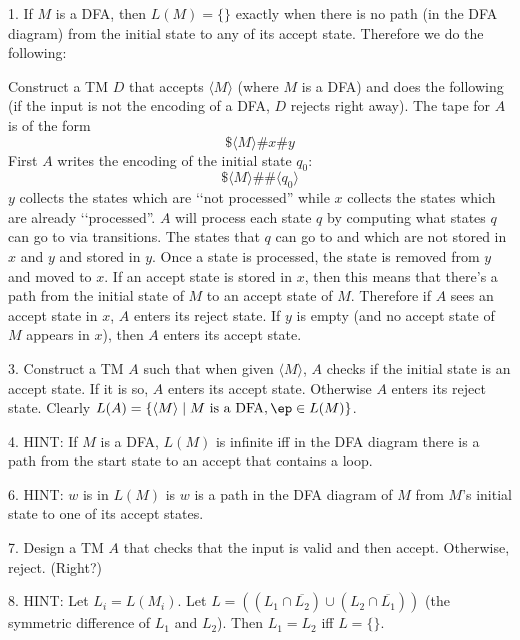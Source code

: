 1.
If $M$ is a DFA, then $L(M) = \{\}$ exactly when there is no
path (in the DFA diagram) from the initial state to any of its
accept state. Therefore we do the following:

Construct a TM $D$ that accepts $\langle M \rangle$
(where $M$ is a DFA) and does the following
(if the input is not the encoding of a DFA, $D$ rejects right away).
The tape for $A$ is of the form
\[
\$ \langle M \rangle \# x \# y
\]
First $A$ writes the encoding of the initial state $q_0$:
\[
\$ \langle M \rangle \# \# \langle q_0 \rangle
\]
$y$ collects the states which are \lq\lq not processed''
while $x$ collects the states which are already \lq\lq processed''.
$A$ will process each state $q$ by computing what states
$q$ can go to via transitions.
The states that $q$ can go to and which are not stored in $x$ and $y$
and stored in $y$.
Once a state is processed, the state is removed from $y$ and
moved to $x$.
If an accept state is stored in $x$, then this means that
there's a path from the initial state of $M$ to 
an accept state of $M$.
Therefore if $A$ sees an accept state in $x$, $A$ enters its reject state.
If $y$ is empty (and no accept state of $M$ appears in $x$),
then $A$ enters its accept state.

3. Construct a TM $A$ such that
when given $\langle M \rangle$, $A$ checks if the initial state is an accept
state. If it is so, $A$ enters its accept state.
Otherwise $A$ enters its reject state.
Clearly $L(A) = \{ \langle M \rangle \mid M \text{ is a DFA},
\ep \in L(M)\}$.

4. HINT:
If $M$ is a DFA, $L(M)$ is infinite iff in the DFA diagram
there is a path from the start state to an accept that contains a loop.


6. HINT: $w$ is in $L(M)$ is $w$ is a path in the DFA diagram of $M$
from $M$'s initial state to one of its accept states.

7. Design a TM $A$ that checks that the input is valid and then
accept. Otherwise, reject. (Right?)

8. HINT: Let $L_i = L(M_i)$.
Let $L = ((L_1 \cap \overline{L_2}) \cup (L_2 \cap \overline{L_1}))$
(the symmetric difference of $L_1$ and $L_2$).
Then $L_1 = L_2$ iff $L = \{\}$.

